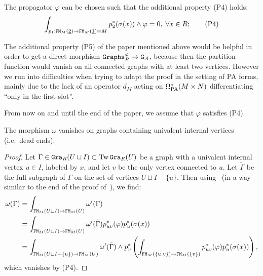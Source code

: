 \begin{proposition}
  \label{cnf.prop.phi-phi}
  The propagator $\varphi$ can be chosen such that the additional property (P4) holds:
  \[ \int_{p_{1} : \mathtt{FM}_{M}(\underline{2}) \to  \mathtt{FM}_{M}(\underline{1}) = M} p_{2}^{*}(\sigma(x)) \wedge \varphi = 0, \; \forall x \in R; \tag{P4} \]
\end{proposition}

\begin{remark}
  \label{cnf.rmk.pfive}
  The additional property (P5) of the paper mentioned above would be helpful in order to get a direct morphism $\mathtt{Graphs}^{\varphi}_{R} \to \mathtt{G}_{A}$, because then the partition function would vanish on all connected graphs with at least two vertices. However we run into difficulties when trying to adapt the proof in the setting of PA forms, mainly due to the lack of an operator $d_{M}$ acting on $\Omega_{\mathrm{PA}}^{*}(M \times N)$ differentiating ``only in the first slot''.
\end{remark}

From now on and until the end of the paper, we assume that $\varphi$ satisfies (P4).

\begin{corollary}
  \label{cnf.cor.weak-vanishing}
  The morphism $\omega$ vanishes on graphs containing univalent internal vertices (i.e.\ dead ends).
\end{corollary}
\begin{proof}
  Let $\Gamma \in \mathtt{Gra}_{R}(U \sqcup I) \subset \operatorname{Tw}\mathtt{Gra}_{R}(U)$ be a graph with a univalent internal vertex $u \in I$, labeled by $x$, and let $v$ be the only vertex connected to $u$.
  Let $\tilde\Gamma$ be the full subgraph of $\Gamma$ on the set of vertices $U \sqcup I - \{u\}$.
  Then using~\cite[Propositions 8.10 and 8.15]{HardtLambrechtsTurchinVolic2011} (in a way similar to the end of the proof of~\cite[Lemma 9.3.9]{LambrechtsVolic2014}), we find:
  \begin{align*}
    \omega(\Gamma)
    & = \int_{\mathtt{FM}_{M}(U \sqcup I) \to \mathtt{FM}_{M}(U)} \omega'(\Gamma) \\
    & = \int_{\mathtt{FM}_{M}(U \sqcup I) \to \mathtt{FM}_{M}(U)} \omega'(\tilde\Gamma) p_{uv}^{*}(\varphi) p_{u}^{*}(\sigma(x)) \\
    & = \int_{\mathtt{FM}_{M}(U \sqcup I - \{u\}) \to \mathtt{FM}_{M}(U)} \omega'(\tilde\Gamma) \wedge p_{v}^{*} \left( \int_{\mathtt{FM}_{M}(\{u,v\}) \to \mathtt{FM}_{M}(\{v\})} p_{uv}^{*}(\varphi) p_{u}^{*}(\sigma(x)) \right),
  \end{align*}
  which vanishes by (P4).
\end{proof}

